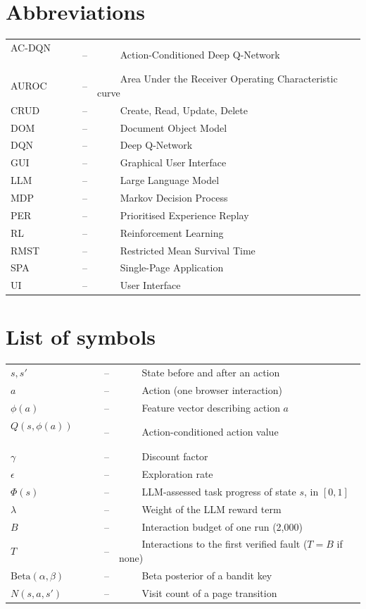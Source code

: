 \documentclass[a4paper, 12pt]{report}
\theoremstyle{definition}
\begin{document}
\section*{{\huge Abbreviations}\hfill} 
\vspace{1.2cm}
\begin{tabular}{lll}
AC-DQN ~~~~&--&~~~~ Action-Conditioned Deep Q-Network\\
AUROC ~~~~&--&~~~~ Area Under the Receiver Operating Characteristic curve\\
CRUD ~~~~&--&~~~~ Create, Read, Update, Delete\\
DOM ~~~~&--&~~~~ Document Object Model\\
DQN ~~~~&--&~~~~ Deep Q-Network\\
GUI ~~~~&--&~~~~ Graphical User Interface\\
LLM ~~~~&--&~~~~ Large Language Model\\
MDP ~~~~&--&~~~~ Markov Decision Process\\
PER ~~~~&--&~~~~ Prioritised Experience Replay\\
RL ~~~~&--&~~~~ Reinforcement Learning\\
RMST ~~~~&--&~~~~ Restricted Mean Survival Time\\
SPA ~~~~&--&~~~~ Single-Page Application\\
UI ~~~~&--&~~~~ User Interface\\
\end{tabular}
\newpage
\section*{{\huge List of symbols}\hfill} 
\vspace{1.2cm}
\begin{tabular}{lll}
$s, s'$ ~~~~&--&~~~~ State before and after an action\\
$a$ ~~~~&--&~~~~ Action (one browser interaction)\\
$\phi(a)$ ~~~~&--&~~~~ Feature vector describing action $a$\\
$Q(s, \phi(a))$ ~~~~&--&~~~~ Action-conditioned action value\\
$\gamma$ ~~~~&--&~~~~ Discount factor\\
$\epsilon$ ~~~~&--&~~~~ Exploration rate\\
$\Phi(s)$ ~~~~&--&~~~~ LLM-assessed task progress of state $s$, in $[0,1]$\\
$\lambda$ ~~~~&--&~~~~ Weight of the LLM reward term\\
$B$ ~~~~&--&~~~~ Interaction budget of one run (2{,}000)\\
$T$ ~~~~&--&~~~~ Interactions to the first verified fault ($T=B$ if none)\\
$\mathrm{Beta}(\alpha, \beta)$ ~~~~&--&~~~~ Beta posterior of a bandit key\\
$N(s, a, s')$ ~~~~&--&~~~~ Visit count of a page transition\\
\end{tabular}
\end{document}

